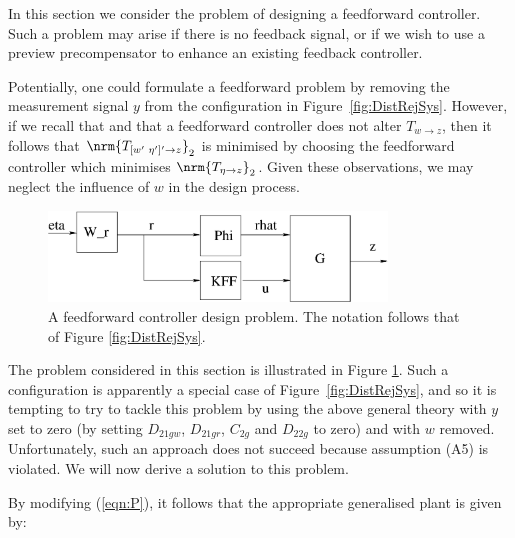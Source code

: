 \label{sec:Preproc}
In this section we consider the problem of designing a feedforward controller. Such a problem may arise if there is no feedback signal, or if we wish to use a preview precompensator to enhance an existing feedback controller. 


Potentially, one could formulate a feedforward problem by removing the measurement signal $y$ from the configuration in Figure~\ref{fig:DistRejSys}. However, if we recall that 
and that a feedforward controller does not alter $T_{w\rightarrow z}$, then it follows that $\nrm{T_{[w'\,\, \eta']'\rightarrow z}}_2$ is minimised by choosing the feedforward controller which minimises $\nrm{T_{\eta \rightarrow z}}_2$.  Given these observations, we may neglect the influence of $w$ in the design process.

\begin{figure}
\begin{center}
\stdcontrolfrags
{}
\includegraphics[width=9cm]{./diags/DistRejSysFF.eps}
\end{center}
\caption{A feedforward controller design problem. The notation follows that of Figure \ref{fig:DistRejSys}.\label{fig:DistRejSysFF}}
\end{figure}

The problem considered in this section is illustrated in Figure \ref{fig:DistRejSysFF}. Such a configuration is apparently a special case of Figure~\ref{fig:DistRejSys}, and so it is tempting to try to tackle this problem by using the above general theory with $y$ set to zero (by setting $D_{21gw}$, $D_{21gr}$, $C_{2g}$ and $D_{22g}$ to zero) and with $w$ removed. Unfortunately, such an approach does not succeed because assumption (A5) is violated. We will now derive a solution to this problem.

By modifying (\ref{eqn:P}), it follows that the appropriate generalised plant is given by:

